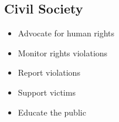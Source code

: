 \subsection{Civil Society}

\begin{itemize}
    \item Advocate for human rights
    \item Monitor rights violations
    \item Report violations
    \item Support victims
    \item Educate the public
\end{itemize}

\cleardoublepage
